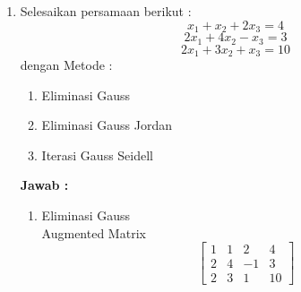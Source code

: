 \documentclass[xcolor=table]{uofa-eng-assignment}
\begin{document}
\maketitle

\begin{enumerate}

    \item Selesaikan persamaan berikut :
          \begin{equation}
              x_1 + x_2 + 2x_3 = 4
          \end{equation}
          \begin{equation}
              2x_1 + 4x_2 - x_3 = 3
          \end{equation}
          \begin{equation}
              2x_1 + 3x_2 + x_3 = 10
          \end{equation}
          dengan Metode :
          \begin{enumerate}
              \item Eliminasi Gauss
              \item Eliminasi Gauss Jordan
              \item Iterasi Gauss Seidell
          \end{enumerate}
          \textbf{Jawab :}
          \medskip
          \begin{enumerate}
              \item Eliminasi Gauss \\
                    Augmented Matrix
                    \begin{equation}
                        \begin{bmatrix}
                            1 & 1 & 2  & 4  \\
                            2 & 4 & -1 & 3  \\
                            2 & 3 & 1  & 10
                        \end{bmatrix}
                    \end{equation}


\end{enumerate}
\end{enumerate}
\end{document}
